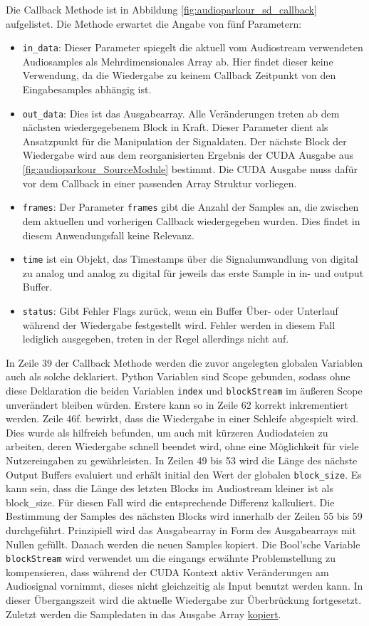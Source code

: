 Die Callback Methode ist in Abbildung \ref{fig:audioparkour_sd_callback} aufgelistet. Die Methode erwartet die Angabe von fünf Parametern:

\begin{itemize}
	\item \texttt{in\_data}: Dieser Parameter spiegelt die aktuell vom Audiostream verwendeten Audiosamples als Mehrdimensionales Array ab. Hier findet dieser keine Verwendung, da die Wiedergabe zu keinem Callback Zeitpunkt von den Eingabesamples abhängig ist.
	\item \texttt{out\_data}: Dies ist das Ausgabearray. Alle Veränderungen treten ab dem nächsten wiedergegebenem Block in Kraft. Dieser Parameter dient als Ansatzpunkt für die Manipulation der Signaldaten. Der nächste Block der Wiedergabe wird aus dem reorganisierten Ergebnis der CUDA Ausgabe aus \ref{fig:audioparkour_SourceModule} bestimmt. Die CUDA Ausgabe muss dafür vor dem Callback in einer passenden Array Struktur vorliegen. 
	\item \texttt{frames}: Der Parameter \texttt{frames} gibt die Anzahl der Samples an, die zwischen dem aktuellen und vorherigen Callback wiedergegeben wurden. Dies findet in diesem Anwendungsfall keine Relevanz.
	\item \texttt{time} ist ein Objekt, das Timestamps über die Signalumwandlung von digital zu analog und analog zu digital für jeweils das erste Sample in in- und output Buffer.
	\item \texttt{status}: Gibt Fehler Flags zurück, wenn ein Buffer Über- oder Unterlauf während der Wiedergabe festgestellt wird. Fehler werden in diesem Fall lediglich ausgegeben, treten in der Regel allerdings nicht auf.
\end{itemize}

In Zeile 39 der Callback Methode werden die zuvor angelegten globalen Variablen auch als solche deklariert. Python Variablen sind Scope gebunden, sodass ohne diese Deklaration die beiden Variablen \texttt{index} und \texttt{blockStream} im äußeren Scope unverändert bleiben würden. Erstere kann so in Zeile 62 korrekt inkrementiert werden. Zeile 46f. bewirkt, dass die Wiedergabe in einer Schleife abgespielt wird. Dies wurde als hilfreich befunden, um auch mit kürzeren Audiodateien zu arbeiten, deren Wiedergabe schnell beendet wird, ohne eine Möglichkeit für viele Nutzereingaben zu gewährleisten. 
In Zeilen 49 bis 53 wird die Länge des nächste Output Buffers evaluiert und erhält initial den Wert der globalen \texttt{block\_size}. Es kann sein, dass die Länge des letzten Blocks im Audiostream kleiner ist als block\_size. Für diesen Fall wird die entsprechende Differenz kalkuliert. 
Die Bestimmung der Samples des nächsten Blocks wird innerhalb der Zeilen 55 bis 59 durchgeführt. Prinzipiell wird das Ausgabearray in Form des Ausgabearrays mit Nullen gefüllt. Danach werden die neuen Samples kopiert. Die Bool'sche Variable \texttt{blockStream} wird verwendet um die eingangs erwähnte Problemstellung zu kompensieren, dass während der CUDA Kontext aktiv Veränderungen am Audiosignal vornimmt, dieses nicht gleichzeitig als Input benutzt werden kann. In dieser Übergangszeit wird die aktuelle Wiedergabe zur Überbrückung fortgesetzt. Zuletzt werden die Sampledaten in das Ausgabe Array \underline{kopiert}. 


